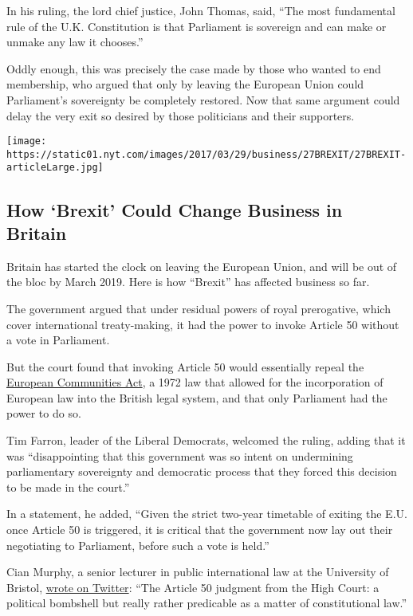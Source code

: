 In his ruling, the lord chief justice, John Thomas, said, ``The most
fundamental rule of the U.K. Constitution is that Parliament is
sovereign and can make or unmake any law it chooses.''

Oddly enough, this was precisely the case made by those who wanted to
end membership, who argued that only by leaving the European Union could
Parliament's sovereignty be completely restored. Now that same argument
could delay the very exit so desired by those politicians and their
supporters.

\href{https://www.nytimes.com/interactive/2016/business/international/brexit-uk-what-happens-business.html}{}

\texttt{[image: https://static01.nyt.com/images/2017/03/29/business/27BREXIT/27BREXIT-articleLarge.jpg]}

\hypertarget{how-brexit-could-change-business-in-britain}{%
\subsection{How `Brexit' Could Change Business in
Britain}\label{how-brexit-could-change-business-in-britain}}

Britain has started the clock on leaving the European Union, and will be
out of the bloc by March 2019. Here is how ``Brexit'' has affected
business so far.

The government argued that under residual powers of royal prerogative,
which cover international treaty-making, it had the power to invoke
Article 50 without a vote in Parliament.

But the court found that invoking Article 50 would essentially repeal
the \href{http://www.legislation.gov.uk/ukpga/1972/68/contents}{European
Communities Act}, a 1972 law that allowed for the incorporation of
European law into the British legal system, and that only Parliament had
the power to do so.

Tim Farron, leader of the Liberal Democrats, welcomed the ruling, adding
that it was ``disappointing that this government was so intent on
undermining parliamentary sovereignty and democratic process that they
forced this decision to be made in the court.''

In a statement, he added, ``Given the strict two-year timetable of
exiting the E.U. once Article 50 is triggered, it is critical that the
government now lay out their negotiating to Parliament, before such a
vote is held.''

Cian Murphy, a senior lecturer in public international law at the
University of Bristol,
\href{https://twitter.com/cianmurf/status/794119281105653760}{wrote on
Twitter}: ``The Article 50 judgment from the High Court: a political
bombshell but really rather predicable as a matter of constitutional
law.''

